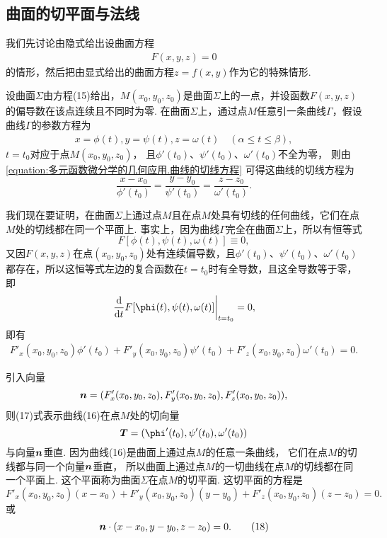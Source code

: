 \subsection{曲面的切平面与法线}
我们先讨论由隐式给出设曲面方程\begin{gather}
F(x,y,z)=0
\tag{15}
\end{gather}的情形，然后把由显式给出的曲面方程\(z = f(x,y)\)作为它的特殊情形.

设曲面\(\Sigma\)由方程(15)给出，\(M(x_0,y_0,z_0)\)是曲面\(\Sigma\)上的一点，并设函数\(F(x,y,z)\)的偏导数在该点连续且不同时为零.
在曲面\(\Sigma\)上，通过点\(M\)任意引一条曲线\(\Gamma\)，假设曲线\(\Gamma\)的参数方程为\begin{gather}
x = \phi(t),
y = \psi(t),
z = \omega(t)
\quad (\alpha \leq t \leq \beta),
\tag{16}
\end{gather}
\(t = t_0\)对应于点\(M(x_0,y_0,z_0)\)，
且\(\phi'(t_0)\)、\(\psi'(t_0)\)、\(\omega'(t_0)\)不全为零，
则由\cref{equation:多元函数微分学的几何应用.曲线的切线方程}
可得这曲线的切线方程为\[
	\frac{x-x_0}{\phi'(t_0)}
	=\frac{y-y_0}{\psi'(t_0)}
	=\frac{z-z_0}{\omega'(t_0)}.
\]

我们现在要证明，在曲面\(\Sigma\)上通过点\(M\)且在点\(M\)处具有切线的任何曲线，它们在点\(M\)处的切线都在同一个平面上.
事实上，因为曲线\(\Gamma\)完全在曲面\(\Sigma\)上，所以有恒等式\[
F[\phi(t),\psi(t),\omega(t)] \equiv 0,
\]又因\(F(x,y,z)\)在点\((x_0,y_0,z_0)\)处有连续偏导数，且\(\phi'(t_0)\)、\(\psi'(t_0)\)、\(\omega'(t_0)\)都存在，所以这恒等式左边的复合函数在\(t = t_0\)时有全导数，且这全导数等于零，即\[
\eval{\dv{t} F[\phi(t),\psi(t),\omega(t)]}_{t=t_0} = 0,
\]即有\begin{gather}
F'_x(x_0,y_0,z_0) \phi'(t_0)
+ F'_y(x_0,y_0,z_0) \psi'(t_0)
+ F'_z(x_0,y_0,z_0) \omega'(t_0)
= 0.
\tag{17}
\end{gather}

引入向量\begin{equation}
	\boldsymbol{n}=(F'_x(x_0,y_0,z_0),F'_y(x_0,y_0,z_0),F'_z(x_0,y_0,z_0)),
\end{equation}
则(17)式表示曲线(16)在点\(M\)处的切向量\[
	\vb{T} = (\phi'(t_0),\psi'(t_0),\omega'(t_0))
\]与向量\(\boldsymbol{n}\)垂直.
因为曲线(16)是曲面上通过点\(M\)的任意一条曲线，
它们在点\(M\)的切线都与同一个向量\(\boldsymbol{n}\)垂直，
所以曲面上通过点\(M\)的一切曲线在点\(M\)的切线都在同一个平面上.
这个平面称为曲面\(\Sigma\)在点\(M\)的切平面.
这切平面的方程是\[
	F'_x(x_0,y_0,z_0) (x-x_0)
	+ F'_y(x_0,y_0,z_0) (y-y_0)
	+ F'_z(x_0,y_0,z_0) (z-z_0)
	= 0.
\]或\begin{gather}
	\boldsymbol{n}\cdot(x-x_0,y-y_0,z-z_0)=0.
	\tag{18}
\end{gather}

